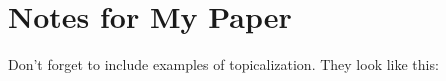 \documentclass[12pt]{article}
\begin{document}
\section*{Notes for My Paper}

Don't forget to include examples of topicalization.
They look like this:
\end{document}
